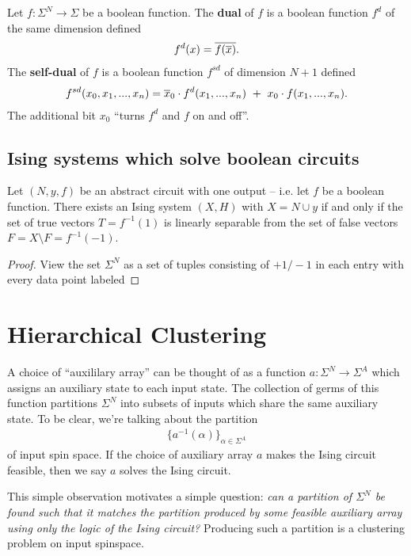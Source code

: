 \documentclass{article}
\begin{document}
\begin{defn}\label{defn:dual-selfdual}
  Let $f:\Sigma^N \to \Sigma$ be a boolean function. The \textbf{dual} of $f$ is a boolean function $f^d$ of the same dimension defined
  \begin{align*}
    f^d(x) = \overline{f(\overline{x})}.
  \end{align*}
  The \textbf{self-dual} of $f$ is a boolean function $f^{sd}$ of dimension $N+1$ defined
  \begin{align*}
    f^{sd}(x_0, x_1,...,x_n) = \overline{x}_0\cdot f^d(x_1,...,x_n) ~+~ x_0\cdot f(x_1,...,x_n).
  \end{align*}
  The additional bit $x_0$ ``turns $f^d$ and $f$ on and off''.
\end{defn}

\subsection{Ising systems which solve boolean circuits}

\begin{prop}\label{prop:boolean-ising-svm-equiv}
  Let $(N, {y}, f)$ be an abstract circuit with one output -- i.e. let $f$ be a boolean function. There exists an Ising system $(X,H)$ with $X = N \cup {y}$ if and only if the set of true vectors $T = f^{-1}(1)$ is linearly separable from the set of false vectors $F = X \setminus F = f^{-1}(-1)$.
\end{prop}
\begin{proof}
  View the set $\Sigma^N$ as a set of tuples consisting of $+1/-1$ in each entry with every data point labeled 
\end{proof}
\section{Hierarchical Clustering}

A choice of ``auxililary array'' can be thought of as a function $a:\Sigma^N \to \Sigma^A$ which assigns an auxiliary state to each input state. The collection of germs of this function partitions $\Sigma^N$ into subsets of inputs which share the same auxiliary state. To be clear, we're talking about the partition
\begin{align*}
  \{a^{-1}(\alpha)\}_{\alpha \in \Sigma^A}
\end{align*}
of input spin space. If the choice of auxiliary array $a$ makes the Ising circuit feasible, then we say $a$ solves the Ising circuit.

This simple observation motivates a simple question: \emph{can a partition of $\Sigma^N$ be found such that it matches the partition produced by some feasible auxiliary array using only the logic of the Ising circuit?} Producing such a partition is a clustering problem on input spinspace.
\end{document}
